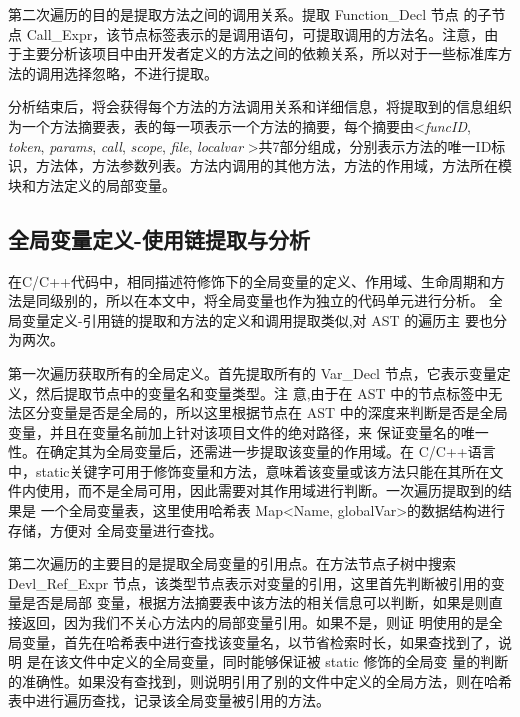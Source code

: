 第二次遍历的目的是提取方法之间的调用关系。提取 Function\_Decl 节点
的子节点 Call\_Expr，该节点标签表示的是调用语句，可提取调用的方法名。注意，由于主要分析该项目中由开发者定义的方法之间的依赖关系，所以对于一些标准库方法的调用选择忽略，不进行提取。

分析结束后，将会获得每个方法的方法调用关系和详细信息，将提取到的信息组织为一个方法摘要表，表的每一项表示一个方法的摘要，每个摘要由\textless \textit{funcID}, \textit{token}, \textit{params}, \textit{call}, \textit{scope}, \textit{file}, \textit{localvar} \textgreater 共7部分组成，分别表示方法的唯一ID标识，方法体，方法参数列表。方法内调用的其他方法，方法的作用域，方法所在模块和方法定义的局部变量。


\subsection{全局变量定义-使用链提取与分析}
在C/C++代码中，相同描述符修饰下的全局变量的定义、作用域、生命周期和方法是同级别的，所以在本文中，将全局变量也作为独立的代码单元进行分析。
全局变量定义-引用链的提取和方法的定义和调用提取类似,对 AST 的遍历主
要也分为两次。


第一次遍历获取所有的全局定义。首先提取所有的
Var\_Decl 节点，它表示变量定义，然后提取节点中的变量名和变量类型。注
意,由于在 AST 中的节点标签中无法区分变量是否是全局的，所以这里根据节点在 AST
中的深度来判断是否是全局变量，并且在变量名前加上针对该项目文件的绝对路径，来
保证变量名的唯一性。在确定其为全局变量后，还需进一步提取该变量的作用域。在
C/C++语言中，static关键字可用于修饰变量和方法，意味着该变量或该方法只能在其所在文
件内使用，而不是全局可用，因此需要对其作用域进行判断。一次遍历提取到的结果是
一个全局变量表，这里使用哈希表 Map<Name, globalVar>的数据结构进行存储，方便对
全局变量进行查找。

第二次遍历的主要目的是提取全局变量的引用点。在方法节点子树中搜索
Devl\_Ref\_Expr 节点，该类型节点表示对变量的引用，这里首先判断被引用的变量是否是局部
变量，根据方法摘要表中该方法的相关信息可以判断，如果是则直接返回，因为我们不关心方法内的局部变量引用。如果不是，则证
明使用的是全局变量，首先在哈希表中进行查找该变量名，以节省检索时长，如果查找到了，说明
是在该文件中定义的全局变量，同时能够保证被 static 修饰的全局变
量的判断的准确性。如果没有查找到，则说明引用了别的文件中定义的全局方法，则在哈希
表中进行遍历查找，记录该全局变量被引用的方法。

